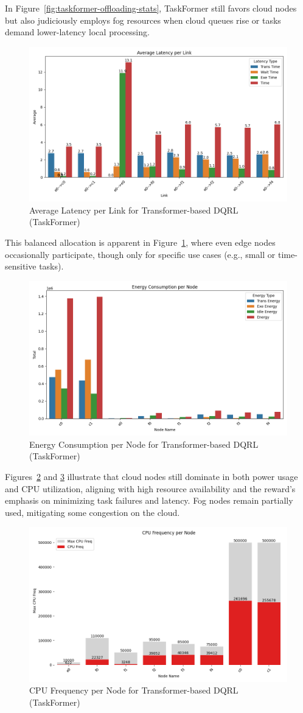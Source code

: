In Figure~\ref{fig:taskformer-offloading-stats}, TaskFormer still favors cloud nodes but also judiciously employs fog resources when cloud queues rise or tasks demand lower-latency local processing.

\begin{figure}[H]
    \centering
    \includegraphics[width=0.5\linewidth]{figs/taskformer_avg_latency_per_link.png}
    \caption{Average Latency per Link for Transformer-based DQRL (TaskFormer)}
    \label{fig:taskformer-avg-latency}
\end{figure}

This balanced allocation is apparent in Figure~\ref{fig:taskformer-avg-latency}, where even edge nodes occasionally participate, though only for specific use cases (e.g., small or time-sensitive tasks). 

\begin{figure}[H]
    \centering
    \includegraphics[width=0.5\linewidth]{figs/taskformer_energy_consumption_per_node.png}
    \caption{Energy Consumption per Node for Transformer-based DQRL (TaskFormer)}
    \label{fig:taskformer-energy-consumption}
\end{figure}

Figures~\ref{fig:taskformer-energy-consumption} and \ref{fig:taskformer-cpu-frequency} illustrate that cloud nodes still dominate in both power usage and CPU utilization, aligning with high resource availability and the reward's emphasis on minimizing task failures and latency. Fog nodes remain partially used, mitigating some congestion on the cloud.

\begin{figure}[H]
    \centering
    \includegraphics[width=0.5\linewidth]{figs/taskformer_cpu_frequency_per_node.png}
    \caption{CPU Frequency per Node for Transformer-based DQRL (TaskFormer)}
    \label{fig:taskformer-cpu-frequency}
\end{figure}




